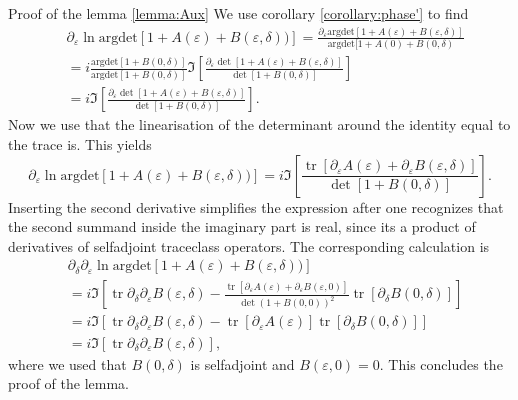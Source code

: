 \documentclass[oneside,reqno,12pt]{amsart}
\DeclareMathOperator{\tr}{tr}
\begin{document}
Proof of the lemma \ref{lemma:Aux} We use corollary \ref{corollary:phase'} to find
\begin{align*}
&\partial_\varepsilon \ln \text{argdet}\left[ 1 + A(\varepsilon) + B(\varepsilon,\delta))\right] 
= \frac{\partial_\varepsilon \text{argdet}[1+A(\varepsilon) + B(\varepsilon,\delta)]}{\text{argdet}[1+A(0)+B(0,\delta)}\\
&=i \frac{\text{argdet}[1+B(0,\delta)]}{\text{argdet}[1+B(0,\delta)]} \Im \left[  \frac{\partial_\varepsilon \det[1+A(\varepsilon)+B(\varepsilon,\delta)]}{\det[1+B(0,\delta)]}\right]\\
&=i \Im \left[ \frac{\partial_\varepsilon \det[1+A(\varepsilon)+B(\varepsilon,\delta)]}{\det[1+B(0,\delta)]}\right].
\end{align*}
Now we use that the linearisation of the determinant around the identity equal to the trace is. This yields
\begin{equation}
\partial_\varepsilon \ln \text{argdet}\left[ 1 + A(\varepsilon) + B(\varepsilon,\delta))\right] 
=i \Im \left[ \frac{ \tr [\partial_\varepsilon A(\varepsilon)+\partial_\varepsilon B(\varepsilon,\delta)]}{\det[1+B(0,\delta)]}\right].
\end{equation}
Inserting the second derivative simplifies the expression after one recognizes that the second summand inside the imaginary part is real, since its a product of derivatives of selfadjoint traceclass operators. The corresponding calculation is
\begin{align*}
&\partial_{\delta} \partial_{\varepsilon} \ln \text{argdet}\left[ 1 + A(\varepsilon) + B(\varepsilon,\delta))\right] \\
&=i \Im \left[ \tr \partial_{\delta}\partial_{\varepsilon} B(\varepsilon,\delta) - \frac{\tr[\partial_{\varepsilon}A(\varepsilon) + \partial_{\varepsilon} B(\varepsilon,0)]}{\det(1+B(0,0))^2} \tr[\partial_{\delta} B(0,\delta)]\right]\\
&=i \Im \left[ \tr \partial_{\delta}\partial_{\varepsilon} B(\varepsilon,\delta) - \tr[\partial_{\varepsilon}A(\varepsilon)] \tr[\partial_{\delta} B(0,\delta)]\right]\\
&=i \Im \left[ \tr \partial_{\delta}\partial_{\varepsilon} B(\varepsilon,\delta) \right],
\end{align*}
where we used that \(B(0,\delta)\) is selfadjoint and \(B(\varepsilon,0)=0\). This concludes the proof of the lemma.
\end{document}
